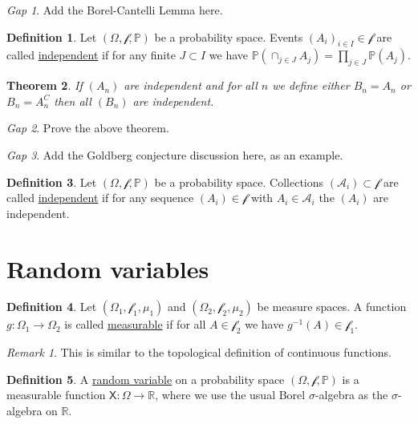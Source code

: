 \documentclass[11pt]{article}
\newcommand{\col}[1]{\mathscr{#1}}
\newcommand{\rv}[1]{\mathsf{#1}}
\newcommand{\p}{\mathbb{P}}
\newcommand{\defname}[1]{\underline{#1}}
\newcommand{\RR}{\mathbb{R}}
\theoremstyle{theorem}
\newtheorem{theorem}{Theorem}[section]
\theoremstyle{definition}
\newtheorem{definition}[theorem]{Definition}
\theoremstyle{remark}
\newtheorem*{remark}{Remark}
\theoremstyle{step}
\theoremstyle{gap}
\newtheorem*{gap}{Gap}
\begin{document}
\begin{gap} Add the Borel-Cantelli Lemma here.\end{gap}

\begin{definition}
Let \((\Omega, \col{f}, \p)\) be a probability space. Events \((A_i)_{i \in I} \in \col{f}\) are called \defname{independent} if for any finite \(J \subset I\) we have \(\p\left(\cap_{j \in J} A_j\right) = \prod_{j \in J} \p\left(A_j\right)\).
\end{definition}

\begin{theorem}
If \((A_n)\) are independent and for all \(n\) we define either \(B_n = A_n\) or \(B_n = A_n^C\) then all \((B_n)\) are independent.
\end{theorem}

\begin{gap}
Prove the above theorem.
\end{gap}

\begin{gap}
Add the Goldberg conjecture discussion here, as an example.
\end{gap}

\begin{definition}
Let \((\Omega, \col{f}, \p)\) be a probability space. Collections \((\col{A}_i) \subset \col{f}\) are called \defname{independent} if for any sequence \((A_i)\in\col{f}\) with \(A_i \in \col{A}_i\) the \((A_i)\) are independent.
\end{definition}

\section{Random variables}

\begin{definition}
Let \((\Omega_1, \col{f}_1, \mu_1)\) and \((\Omega_2, \col{f}_2, \mu_2)\) be measure spaces. A function \(g: \Omega_1 \to \Omega_2\) is called \defname{measurable} if for all \(A \in \col{f}_2\) we have \(g^{-1}(A) \in \col{f}_1\).
\end{definition}

\begin{remark}
This is similar to the topological definition of continuous functions.
\end{remark}


\begin{definition}
A \defname{random variable} on a probability space \((\Omega, \col{f}, \p)\) is a measurable function \(\rv{X}:\Omega \to \RR\), where we use the usual Borel \(\sigma\)-algebra as the \(\sigma\)-algebra on \(\RR\).
\end{definition}
\end{document}
